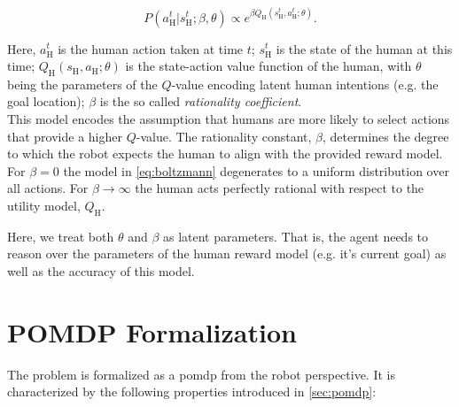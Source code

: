 \begin{equation}\label{eq:boltzmann}
  P\left(a^t_\text{H} | s^t_\text{H}; \beta, \theta \right) \propto e^{\beta Q_\text{H}\left(s^t_\text{H}, a^t_\text{H}; \theta\right)}.
\end{equation}

Here, $a^t_\text{H}$ is the human action taken at time $t$; $s^t_\text{H}$ is
the state of the human at this time; $Q_\text{H}(s_\text{H}, a_\text{H}; \theta)$ is the
state-action value function of the human, with $\theta$ being the parameters of the
$Q$-value encoding latent human intentions (e.g. the goal location); $\beta$ is
the so called \emph{rationality coefficient}.\\
This model encodes the assumption that humans are more likely to select actions that
provide a higher $Q$-value. The rationality constant, $\beta$, determines the
degree to which the robot expects the human to align with the provided reward
model. For $\beta = 0$ the model in \cref{eq:boltzmann} degenerates to
a uniform distribution over all actions. For $\beta \to \infty$ the human acts
perfectly rational with respect to the utility model,
$Q_\text{H}$.

Here, we treat both $\theta$ and $\beta$ as latent parameters. That is, the
agent needs to reason over the parameters of the human reward model (e.g. it's
current goal) as well as the accuracy of this model.

\section{POMDP Formalization}\label{sec:hri-pomdp-formalization}

The problem is formalized as a \ac{pomdp} from the robot perspective. It is
characterized by the following properties introduced in \cref{sec:pomdp}:

